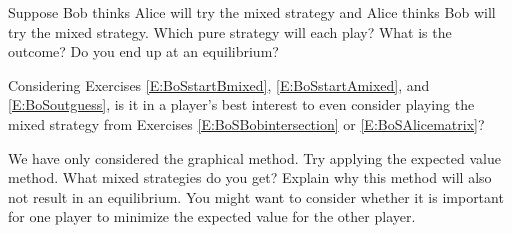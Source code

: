 \begin{xca}\label{E:BoSoutguess}
Suppose Bob thinks Alice will try the mixed strategy and Alice thinks Bob will try the mixed strategy. Which pure strategy will each play? What is the outcome? Do you end up at an equilibrium?
\end{xca}

\begin{xca}\label{E:BoSeverplaymixed}
Considering Exercises \ref{E:BoSstartBmixed}, \ref{E:BoSstartAmixed}, and \ref{E:BoSoutguess}, is it in a player's best interest to even consider playing the mixed strategy from Exercises \ref{E:BoSBobintersection} or \ref{E:BoSAlicematrix}?
\end{xca}

\begin{xca}\label{E:BoSevsol}
We have only considered the graphical method. Try applying the expected value method. What mixed strategies do you get? Explain why this method will also not result in an equilibrium. You might want to consider whether it is important for one player to minimize the expected value for the other player.
\end{xca}





 